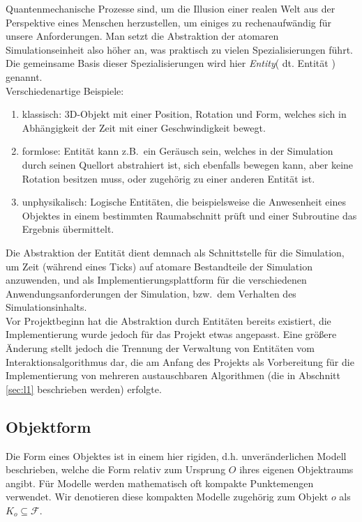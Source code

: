 Quantenmechanische Prozesse sind, um die Illusion einer realen Welt aus der Perspektive eines Menschen herzustellen, um einiges zu rechenaufwändig für unsere Anforderungen. Man setzt die Abstraktion der atomaren Simulationseinheit also höher an, was praktisch zu vielen Spezialisierungen führt. Die gemeinsame Basis dieser Spezialisierungen wird hier \textit{Entity}( dt. Entität ) genannt.\\

Verschiedenartige Beispiele:
\begin{enumerate}
\item klassisch: 3D-Objekt mit einer Position, Rotation und Form, welches sich in Abhängigkeit der Zeit mit einer Geschwindigkeit bewegt.\\
\item formlose: Entität kann z.B.~ein Geräusch sein, welches in der Simulation durch seinen Quellort abstrahiert ist, sich ebenfalls bewegen kann, aber keine Rotation besitzen muss, oder zugehörig zu einer anderen Entität ist.
\item unphysikalisch: Logische Entitäten, die beispielsweise die Anwesenheit eines Objektes in einem bestimmten Raumabschnitt prüft und einer Subroutine das Ergebnis übermittelt.
\end{enumerate}
Die Abstraktion der Entität dient demnach als Schnittstelle für die Simulation, um Zeit (während eines Ticks) auf atomare Bestandteile der Simulation anzuwenden, und als Implementierungsplattform für die verschiedenen Anwendungsanforderungen der Simulation, bzw.~dem Verhalten des Simulationsinhalts.\\

Vor Projektbeginn hat die Abstraktion durch Entitäten bereits existiert, die Implementierung wurde jedoch für das Projekt etwas angepasst. Eine größere Änderung stellt jedoch die Trennung der Verwaltung von Entitäten vom Interaktionsalgorithmus dar, die am Anfang des Projekts als Vorbereitung für die Implementierung von mehreren austauschbaren Algorithmen (die in Abschnitt \ref{sec:l1} beschrieben werden) erfolgte.

\subsection{Objektform}
\label{object_form}
Die Form eines Objektes ist in einem hier rigiden, d.h. unveränderlichen Modell beschrieben, welche die Form relativ zum Ursprung $O$ ihres eigenen Objektraums angibt.
Für Modelle werden mathematisch oft kompakte Punktemengen verwendet. Wir denotieren diese kompakten Modelle zugehörig zum Objekt $o$ als $ K_o \subseteq \mathcal{F}$.\\

